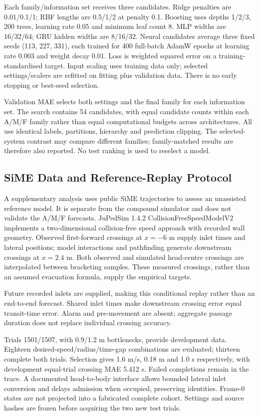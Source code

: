 \documentclass[conference]{IEEEtran}
\begin{document}
Each family/information set receives three candidates. Ridge penalties are 0.01/0.1/1; RBF lengths are 0.5/1/2 at penalty 0.1. Boosting uses depths 1/2/3, 200 trees, learning rate 0.05 and minimum leaf count 8. MLP widths are 16/32/64; GRU hidden widths are 8/16/32. Neural candidates average three fixed seeds (113, 227, 331), each trained for 400 full-batch AdamW epochs at learning rate 0.003 and weight decay 0.01. Loss is weighted squared error on a training-standardised target. Input scaling uses training data only; selected settings/scalers are refitted on fitting plus validation data. There is no early stopping or best-seed selection.

Validation MAE selects both settings and the final family for each information set. The search contains 54 candidates, with equal candidate counts within each A/M/F family rather than equal computational budgets across architectures. All use identical labels, partitions, hierarchy and prediction clipping. The selected-system contrast may compare different families; family-matched results are therefore also reported. No test ranking is used to reselect a model.


\subsection{SiME Data and Reference-Replay Protocol}
A supplementary analysis uses public SiME trajectories \cite{SIME} to assess an unassisted reference model. It is separate from the compound simulator and does not validate the A/M/F forecasts. JuPedSim 1.4.2 CollisionFreeSpeedModelV2 implements a two-dimensional collision-free speed approach \cite{CFS} with recorded wall geometry. Observed first-forward crossings at $x=-6$ m supply inlet times and lateral positions; model interactions and pathfinding generate downstream crossings at $x=2.4$ m. Both observed and simulated head-centre crossings are interpolated between bracketing samples. These measured crossings, rather than an assumed evacuation formula, supply the empirical targets.

Future recorded inlets are supplied, making this conditional replay rather than an end-to-end forecast. Shared inlet times make downstream crossing error equal transit-time error. Alarm and pre-movement are absent; aggregate passage duration does not replace individual crossing accuracy.

Trials 1501/1507, with 0.9/1.2 m bottlenecks, provide development data. Eighteen desired-speed/radius/time-gap combinations are evaluated; thirteen complete both trials. Selection gives 1.6 m/s, 0.18 m and 1.0 s respectively, with development equal-trial crossing MAE 5.412 s. Failed completions remain in the trace. A documented head-to-body interface allows bounded lateral inlet conversion and delays admission when occupied, preserving identities. Frame-0 states are not projected into a fabricated complete cohort. Settings and source hashes are frozen before acquiring the two new test trials.
\end{document}
